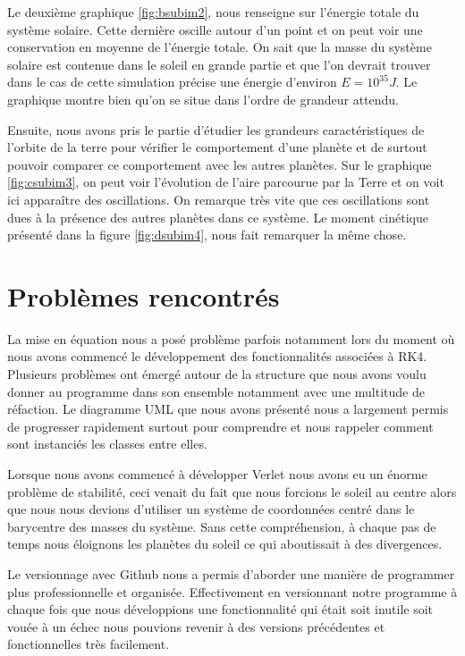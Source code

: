 \documentclass[11pt]{article}
\begin{document}
Le deuxième graphique \ref{fig:bsubim2}, nous renseigne sur l'énergie totale du système solaire.  Cette dernière oscille autour d'un point et on peut voir une conservation en moyenne de l'énergie totale. On sait que la masse du système solaire est contenue dans le soleil en grande partie et que l'on devrait trouver dans le cas de cette simulation précise une énergie d'environ 
$E = 10^{35} J$. Le graphique montre bien qu'on se situe dans l'ordre de grandeur attendu.

Ensuite, nous avons pris le partie d'étudier les grandeurs caractéristiques de l'orbite de la terre pour vérifier le comportement d'une planète et de surtout pouvoir comparer ce comportement avec les autres planètes. Sur le graphique \ref{fig:csubim3}, on peut voir l'évolution de l'aire parcourue par la Terre et on voit ici apparaître des oscillations. On remarque très vite que ces oscillations sont dues à la présence des autres planètes dans ce système. Le moment cinétique présenté dans la figure \ref{fig:dsubim4}, nous fait remarquer la même chose.



\section{Problèmes rencontrés}

La mise en équation nous a posé problème parfois notamment lors du moment où nous avons commencé le développement des fonctionnalités associées à RK4. Plusieurs problèmes ont émergé autour de la structure que nous avons voulu donner au programme dans son ensemble notamment avec une multitude de réfaction. Le diagramme UML que nous avons présenté nous a largement permis de progresser rapidement surtout pour comprendre et nous rappeler comment sont instanciés les classes entre elles.

Lorsque nous avons commencé à développer Verlet nous avons eu un énorme problème de stabilité, ceci venait du fait que nous forcions le soleil au centre alors que nous nous devions d'utiliser un système de coordonnées centré dans le barycentre des masses du système. Sans cette compréhension, à chaque pas de temps nous éloignons les planètes du soleil ce qui aboutissait à des divergences.

Le versionnage avec Github nous a permis d'aborder une manière de programmer plus professionnelle et organisée. Effectivement en versionnant notre programme à chaque fois que nous développions une fonctionnalité qui était soit inutile soit vouée à un échec nous pouvions revenir à des versions précédentes et fonctionnelles très facilement.
\end{document}
